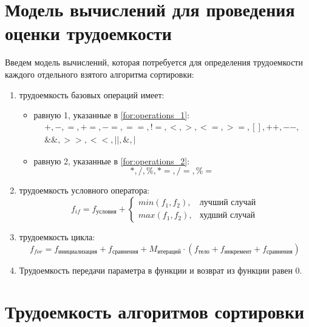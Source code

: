 \section{Модель вычислений для проведения оценки трудоемкости}

Введем модель вычислений, которая потребуется для определения трудоемкости каждого отдельного взятого алгоритма сортировки:
\begin{enumerate}
	\item трудоемкость базовых операций имеет:
	\begin{itemize}
		\item равную 1, указанные в \ref{for:operations_1}:
		\begin{equation}
			\label{for:operations_1}
			\begin{aligned}
				+, -, =, +=, -=, ==, !=, <, >, <=, >=, [], ++, {-}-,\\
				\&\&, >>, <<, ||, \&, |
			\end{aligned}
		\end{equation}
		\item равную 2, указанные в \ref{for:operations_2}:
		\begin{equation}
			\label{for:operations_2}
			*, /, \%, *=, /=, \%=
		\end{equation}
	\end{itemize}
	\item трудоемкость условного оператора:
	\begin{equation}
		\label{for:if}
		f_{if} = f_{\text{условия}} + 
		\begin{cases}
			min(f_1, f_2), & \text{лучший случай}\\
			max(f_1, f_2), & \text{худший случай}
		\end{cases}
	\end{equation}
	\item трудоемкость цикла:
	\begin{equation}
		\label{for:for}
		f_{for} = f_{\text{инициализация}} + f_{\text{сравнения}} + M_{\text{итераций}} \cdot (f_{\text{тело}} + f_{\text{инкремент}} + f_{\text{сравнения}})
	\end{equation}
	\item Трудоемкость передачи параметра в функции и возврат из функции равен 0.
\end{enumerate}

\section{Трудоемкость алгоритмов сортировки}

